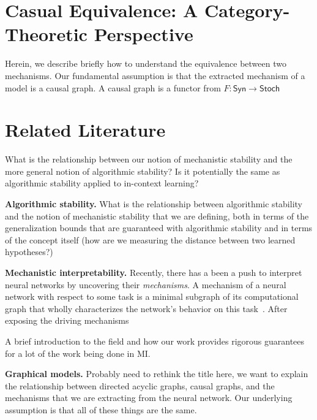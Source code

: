 \documentclass[10pt]{article}
\begin{document}
\section{Casual Equivalence: A Category-Theoretic Perspective}
Herein, we describe briefly how to understand the equivalence between two mechanisms.
Our fundamental assumption is that the extracted mechanism of a model is 
a causal graph.
A causal graph is a functor from $F: \textsf{Syn} \to \textsf{Stoch}$


\section{Related Literature}
What is the relationship between our notion of mechanistic stability and 
the more general notion of algorithmic stability? Is it potentially the same
as algorithmic stability applied to in-context learning?

\textbf{Algorithmic stability.} What is the relationship between algorithmic
stability and the notion of mechanistic stability that we are defining, both
in terms of the generalization bounds that are guaranteed with algorithmic
stability and in terms of the concept itself (how are we measuring
the distance between two learned hypotheses?)

\textbf{Mechanistic interpretability.} Recently, there has a been a push to interpret
neural networks by uncovering their
\textit{mechanisms}. A mechanism of a neural network with respect to some task
is a minimal subgraph of its computational graph that wholly characterizes the
network's behavior on this task~\citep{wang_interpretability_2022}. After exposing
the driving mechanisms 

A brief introduction to the field
and how our work provides rigorous guarantees for a lot of the work being
done in MI.

\textbf{Graphical models.} Probably need to rethink the title here, we want
to explain the relationship between directed acyclic graphs, causal graphs,
and the mechanisms that we are extracting from the neural network. Our
underlying assumption is that all of these things are the same.
\end{document}
